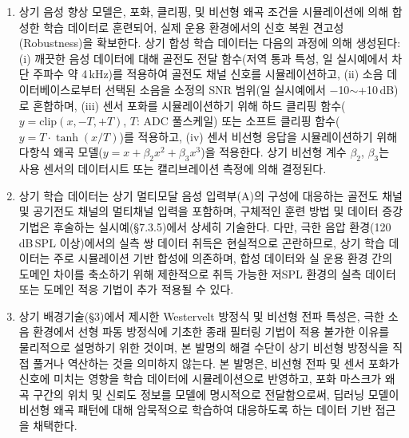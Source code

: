 \documentclass{article}
\begin{document}
\begin{enumerate}[label = \textbf{(B.3.\arabic*)}]

    \item 상기 음성 향상 모델은, 포화, 클리핑, 및 비선형 왜곡 조건을 시뮬레이션에 의해 합성한 학습 데이터로 훈련되어, 실제 운용 환경에서의 신호 복원 견고성(Robustness)을 확보한다. 상기 합성 학습 데이터는 다음의 과정에 의해 생성된다: (i) 깨끗한 음성 데이터에 대해 골전도 전달 함수(저역 통과 특성, 일 실시예에서 차단 주파수 약 4\,kHz)를 적용하여 골전도 채널 신호를 시뮬레이션하고, (ii) 소음 데이터베이스로부터 선택된 소음을 소정의 SNR 범위(일 실시예에서 $-$10$\sim$+10\,dB)로 혼합하며, (iii) 센서 포화를 시뮬레이션하기 위해 하드 클리핑 함수($y = \mathrm{clip}(x, -T, +T)$, $T$: ADC 풀스케일) 또는 소프트 클리핑 함수($y = T \cdot \tanh(x/T)$)를 적용하고, (iv) 센서 비선형 응답을 시뮬레이션하기 위해 다항식 왜곡 모델($y = x + \beta_2 x^2 + \beta_3 x^3$)을 적용한다. 상기 비선형 계수 $\beta_2$, $\beta_3$는 사용 센서의 데이터시트 또는 캘리브레이션 측정에 의해 결정된다.

    \item 상기 학습 데이터는 상기 멀티모달 음성 입력부(A)의 구성에 대응하는 골전도 채널 및 공기전도 채널의 멀티채널 입력을 포함하며, 구체적인 훈련 방법 및 데이터 증강 기법은 후술하는 실시예(§7.3.5)에서 상세히 기술한다. 다만, 극한 음압 환경(120\,dB\,SPL 이상)에서의 실측 쌍 데이터 취득은 현실적으로 곤란하므로, 상기 학습 데이터는 주로 시뮬레이션 기반 합성에 의존하며, 합성 데이터와 실 운용 환경 간의 도메인 차이를 축소하기 위해 제한적으로 취득 가능한 저SPL 환경의 실측 데이터 또는 도메인 적응 기법이 추가 적용될 수 있다.

    \item 상기 배경기술(§3)에서 제시한 Westervelt 방정식 및 비선형 전파 특성은, 극한 소음 환경에서 선형 파동 방정식에 기초한 종래 필터링 기법이 적용 불가한 이유를 물리적으로 설명하기 위한 것이며, 본 발명의 해결 수단이 상기 비선형 방정식을 직접 풀거나 역산하는 것을 의미하지 않는다. 본 발명은, 비선형 전파 및 센서 포화가 신호에 미치는 영향을 학습 데이터에 시뮬레이션으로 반영하고, 포화 마스크가 왜곡 구간의 위치 및 신뢰도 정보를 모델에 명시적으로 전달함으로써, 딥러닝 모델이 비선형 왜곡 패턴에 대해 암묵적으로 학습하여 대응하도록 하는 데이터 기반 접근을 채택한다.

\end{enumerate}
\end{document}
